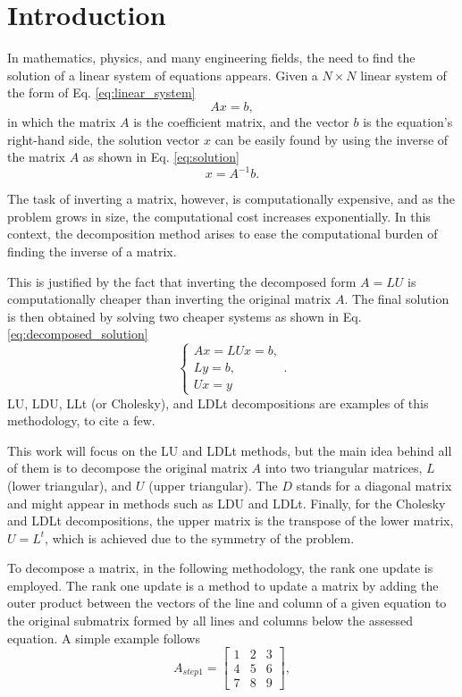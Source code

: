 \section{Introduction} \label{sec:introduction}
In mathematics, physics, and many engineering fields, the need to find the solution of a linear system of equations appears. Given a $N\times N$ linear system of the form of Eq. \eqref{eq:linear_system}
\begin{equation}
    Ax = b,
    \label{eq:linear_system}
\end{equation}
in which the matrix $A$ is the coefficient matrix, and the vector $b$ is the equation's right-hand side, the solution vector $x$ can be easily found by using the inverse of the matrix $A$ as shown in Eq. \eqref{eq:solution}
\begin{equation}
    x = A^{-1}b.
    \label{eq:solution}
\end{equation}

The task of inverting a matrix, however, is computationally expensive, and as the problem grows in size, the computational cost increases exponentially. In this context, the decomposition method arises to ease the computational burden of finding the inverse of a matrix. 

This is justified by the fact that inverting the decomposed form $A=LU$ is computationally cheaper than inverting the original matrix $A$. The final solution is then obtained by solving two cheaper systems as shown in Eq. \eqref{eq:decomposed_solution}
\begin{equation}
    \begin{cases}
        Ax = LUx = b, \\
        Ly = b, \\
        Ux = y
    \end{cases}.
    \label{eq:decomposed_solution}
\end{equation}
LU, LDU, LLt (or Cholesky), and LDLt decompositions are examples of this methodology, to cite a few. 

This work will focus on the LU and LDLt methods, but the main idea behind all of them is to decompose the original matrix $A$ into two triangular matrices, $L$ (lower triangular), and $U$ (upper triangular). The $D$ stands for a diagonal matrix and might appear in methods such as LDU and LDLt. Finally, for the Cholesky and LDLt decompositions, the upper matrix is the transpose of the lower matrix, $U = L^t$, which is achieved due to the symmetry of the problem.

To decompose a matrix, in the following methodology, the rank one update is employed. The rank one update is a method to update a matrix by adding the outer product between the vectors of the line and column of a given equation to the original submatrix formed by all lines and columns below the assessed equation. A simple example follows 
\begin{equation*}
    A_{step1} =
    \begin{bmatrix}
        1 & 2 & 3 \\
        4 & 5 & 6 \\
        7 & 8 & 9
    \end{bmatrix},
\end{equation*}

